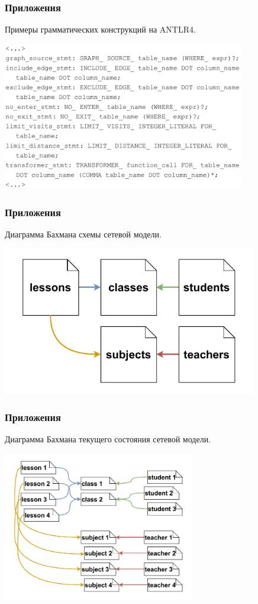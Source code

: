 \documentclass[pdf, hyperref={unicode}, aspectratio=169]{beamer}
\begin{document}
\begin{frame}
\frametitle{Приложения}
	Примеры грамматических конструкций на ANTLR4.

	\begin{center}
		\includegraphics[height = 6.5cm]{img/grammar}
	\end{center}
\end{frame}


\begin{frame}
\frametitle{Приложения}
	Диаграмма Бахмана схемы сетевой модели.

	\begin{center}
		\includegraphics[height = 6.5cm]{img/codasyl-db-schema}
	\end{center}
\end{frame}


\begin{frame}
\frametitle{Приложения}
	Диаграмма Бахмана текущего состояния сетевой модели.

	\begin{center}
		\includegraphics[height = 6.5cm]{img/codasyl-db-state}
	\end{center}
\end{frame}
\end{document}

